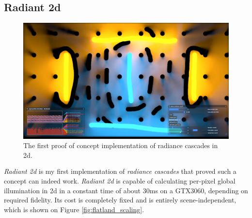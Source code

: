 \documentclass{jcgt}
\begin{document}
\subsection{Radiant 2d}
\begin{figure}[htb]
  \centering
  \includegraphics[width=\columnwidth]{images/gi_2d.png}
  \caption{\label{fig:radiant_2d}
     The first proof of concept implementation of radiance cascades in 2d.}
\end{figure}
\emph{Radiant 2d} is my first implementation of \emph{radiance cascades} that proved such a concept can indeed work. \emph{Radiant 2d} is capable of calculating per-pixel global illumination in 2d in a constant time of about 30ms on a GTX3060, depending on required fidelity. Its cost is completely fixed and is entirely scene-independent, which is shown on Figure \ref{fig:flatland_scaling}.
\end{document}
